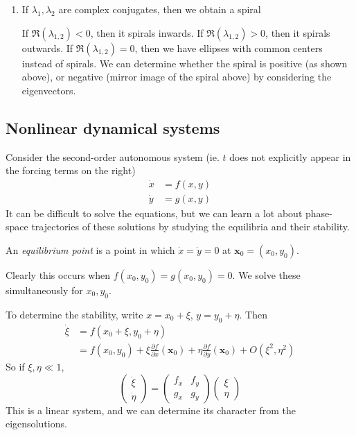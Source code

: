 \documentclass[a4paper]{article}
\begin{document}
\begin{enumerate}
  \item If $\lambda_1, \lambda_2$ are complex conjugates, then we obtain a spiral
    \begin{center}
    \end{center}
    If $\Re (\lambda_{1, 2}) < 0$, then it spirals inwards. If $\Re (\lambda_{1, 2}) > 0$, then it spirals outwards. If $\Re (\lambda_{1, 2}) = 0$, then we have ellipses with common centers instead of spirals. We can determine whether the spiral is positive (as shown above), or negative (mirror image of the spiral above) by considering the eigenvectors.
\end{enumerate}

\subsection{Nonlinear dynamical systems}
Consider the second-order autonomous system (ie. $t$ does not explicitly appear in the forcing terms on the right)
\begin{align*}
  \dot x &= f(x, y)\\
  \dot y &= g(x, y)
\end{align*}
It can be difficult to solve the equations, but we can learn a lot about phase-space trajectories of these solutions by studying the equilibria and their stability.

\begin{defi}
  An \emph{equilibrium point} is a point in which $\dot x = \dot y = 0$ at $\mathbf{x}_0 = (x_0, y_0)$.
\end{defi}

Clearly this occurs when $f(x_0, y_0) = g(x_0, y_0) = 0$. We solve these simultaneously for $x_0, y_0$.

To determine the stability, write $x = x_0 + \xi$, $y = y_0 + \eta$. Then
\begin{align*}
  \dot \xi &= f(x_0 + \xi, y_0 + \eta)\\
  &= f(x_0, y_0)+ \xi \frac{\partial f}{\partial x}(\mathbf{x}_0) + \eta \frac{\partial f}{\partial y}(\mathbf{x}_0) + O(\xi^2, \eta^2)
\end{align*}
So if $\xi, \eta \ll 1$,
\[
  \begin{pmatrix}
    \dot \xi\\\dot \eta
  \end{pmatrix} =
  \begin{pmatrix}
    f_x & f_y\\
    g_x & g_y
  \end{pmatrix}
  \begin{pmatrix}
    \xi\\\eta
  \end{pmatrix}
\]
This is a linear system, and we can determine its character from the eigensolutions.
\end{document}
